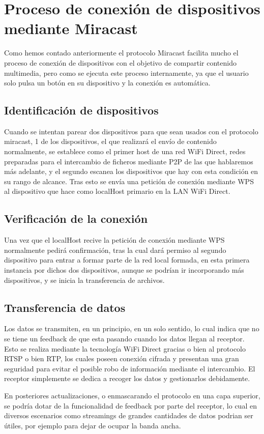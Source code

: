 \section{Proceso de conexión de dispositivos mediante Miracast}

Como hemos contado anteriormente el protocolo Miracast facilita mucho el proceso de conexión de dispositivos con el objetivo de compartir contenido multimedia, pero como se ejecuta este proceso internamente, ya que el usuario solo pulsa un botón en su dispositivo y la conexión es automática.

\subsection{Identificación de dispositivos}

Cuando se intentan parear dos dispositivos para que sean usados con el protocolo miracast, 1 de los dispositivos, el que realizará el envío de contenido normalmente, se establece como el primer host de una red WiFi Direct, redes preparadas para el intercambio de ficheros mediante P2P de las que hablaremos más adelante, y el segundo escanea los dispositivos que hay con esta condición en su rango de alcance. Tras esto se envía una petición de conexión mediante WPS al dispositivo que hace como localHost primario en la LAN WiFi Direct.

\subsection{Verificación de la conexión}

Una vez que el localHost recive la petición de conexión mediante WPS normalmente pedirá confirmación, tras la cual dará permiso al segundo dispositivo para entrar a formar parte de la red local formada, en esta primera instancia por dichos dos dispositivos, aunque se podrían ir incorporando más dispositivos, y se inicia la transferencia de archivos.

\subsection{Transferencia de datos}

Los datos se transmiten, en un principio, en un solo sentido, lo cual indica que no se tiene un feedback de que esta pasando cuando los datos llegan al receptor. Esto se realiza mediante la tecnología WiFi Direct gracias o bien al protocolo RTSP o bien RTP, los cuales poseen conexión cifrada y presentan una gran seguridad para evitar el posible robo de información mediante el intercambio. El receptor simplemente se dedica a recoger los datos y gestionarlos debidamente.

En posteriores actualizaciones, o enmascarando el protocolo en una capa superior, se podría dotar de la funcionalidad de feedback por parte del receptor, lo cual en diversos escenarios como streamings de grandes cantidades de datos podrian ser útiles, por ejemplo para dejar de ocupar la banda ancha.
